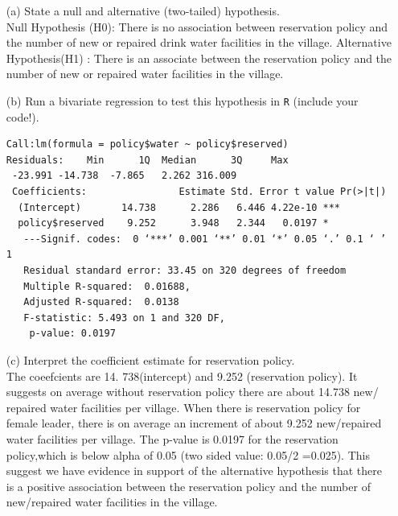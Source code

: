 \documentclass[12pt,letterpaper]{article}
\begin{document}
\newpage
\begin{enumerate}
	\item [(a)] State a null and alternative (two-tailed) hypothesis. 
\\Null Hypothesis (H0): There is no association between reservation policy and the number of new or repaired drink water facilities in the village.
Alternative Hypothesis(H1)	: There is an associate between the reservation policy and the number of new or repaired water facilities in the village.
	\vspace{6cm}
	\item [(b)] Run a bivariate regression to test this hypothesis in \texttt{R} (include your code!).
	  	
\begin{verbatim}
Call:lm(formula = policy$water ~ policy$reserved)
Residuals:    Min      1Q  Median      3Q     Max
 -23.991 -14.738  -7.865   2.262 316.009 
 Coefficients:                Estimate Std. Error t value Pr(>|t|)   
  (Intercept)       14.738      2.286   6.446 4.22e-10 ***
  policy$reserved    9.252      3.948   2.344   0.0197 * 
   ---Signif. codes:  0 ‘***’ 0.001 ‘**’ 0.01 ‘*’ 0.05 ‘.’ 0.1 ‘ ’ 1
   Residual standard error: 33.45 on 320 degrees of freedom
   Multiple R-squared:  0.01688,	
   Adjusted R-squared:  0.0138 
   F-statistic: 5.493 on 1 and 320 DF, 
    p-value: 0.0197
\end{verbatim} 	
	\vspace{6cm}
	\item [(c)] Interpret the coefficient estimate for reservation policy. 
\\ The coeefcients are 14. 738(intercept) and 9.252 (reservation policy). It suggests on average without reservation policy there are about 14.738 new/ repaired water facilities per village. When there is reservation policy for female leader, there is on average an increment of about 9.252 new/repaired water facilities per village.  The p-value is 0.0197 for the reservation policy,which is below alpha of 0.05 (two sided value: 0.05/2 =0.025). This suggest we have evidence in support of the alternative hypothesis that there is a positive association between the reservation policy and the number of new/repaired water facilities in the village.
\end{enumerate}
\end{document}
